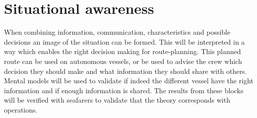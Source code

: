 \section{Situational awareness}
When combining information, communication, characteristics and possible decisions an image of the situation can be formed. This will be interpreted in a way which enables the right decision making for route-planning. This planned route can be used on autonomous vessels, or be used to advise the crew which decision they should make and what information they should share with others. Mental models will be used to validate if indeed the different vessel have the right information and if enough information is shared. The results from these blocks will be verified with seafarers to validate that the theory corresponds with operations.
